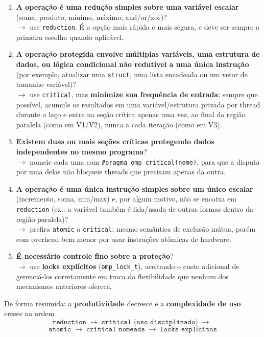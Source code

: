 \documentclass[a4paper,12pt]{article}
\begin{document}
\begin{enumerate}
    \item \textbf{A operação é uma redução simples sobre uma
    variável escalar} (soma, produto, mínimo, máximo, and/or/xor)?
    \\ $\rightarrow$ use \texttt{reduction}. É a opção mais rápida e
    mais segura, e deve ser sempre a primeira escolha quando aplicável.

    \item \textbf{A operação protegida envolve múltiplas variáveis,
    uma estrutura de dados, ou lógica condicional não redutível a uma
    única instrução} (por exemplo, atualizar uma \texttt{struct}, uma
    lista encadeada ou um vetor de tamanho variável)? \\
    $\rightarrow$ use \texttt{critical}, mas \textbf{minimize sua
    frequência de entrada}: sempre que possível, acumule os
    resultados em uma variável/estrutura privada por thread durante o
    laço e entre na seção crítica apenas uma vez, ao final da região
    paralela (como em V1/V2), nunca a cada iteração (como em V3).

    \item \textbf{Existem duas ou mais seções críticas protegendo
    dados independentes no mesmo programa}? \\
    $\rightarrow$ nomeie cada uma com
    \texttt{\#pragma omp critical(nome)}, para que a disputa por uma
    delas não bloqueie threads que precisam apenas da outra.

    \item \textbf{A operação é uma única instrução simples sobre um
    único escalar} (incremento, soma, min/max) e, por algum motivo,
    não se encaixa em \texttt{reduction} (ex.: a variável também é
    lida/usada de outras formas dentro da região paralela)? \\
    $\rightarrow$ prefira \texttt{atomic} a \texttt{critical}: mesmo
    semântica de exclusão mútua, porém com overhead bem menor por
    usar instruções atômicas de hardware.

    \item \textbf{É necessário controle fino sobre a proteção}? \\
    $\rightarrow$ use \textbf{locks explícitos}
    (\texttt{omp\_lock\_t}), aceitando o custo adicional de
    gerenciá-los corretamente em troca da flexibilidade que nenhum
    dos mecanismos anteriores oferece.
\end{enumerate}

De forma resumida: a \textbf{produtividade} decresce e a
\textbf{complexidade de uso} cresce na ordem
$$\texttt{reduction} \;\rightarrow\; \texttt{critical (uso disciplinado)} \;\rightarrow\;$$
$$\texttt{atomic} \;\rightarrow\; \texttt{critical nomeada} \;\rightarrow\; \texttt{locks explícitos}$$
\end{document}
